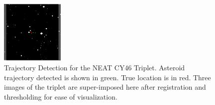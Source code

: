 \begin{figure}[t]
\vspace{-0.3cm}
\begin{center}
\includegraphics[width=0.27\textwidth]{Figures/NEATLines_LogicalImg.pdf}
\end{center}
\vspace{-0.7cm}
\caption{Trajectory Detection for the NEAT CY46 Triplet. Asteroid trajectory detected is shown in green. True location is in red. Three images of the triplet are super-imposed here after registration and thresholding for ease of visualization.}
\label{fig:IPP_NEAT_Trajectory}
\vspace{-0.3cm}
\end{figure}


